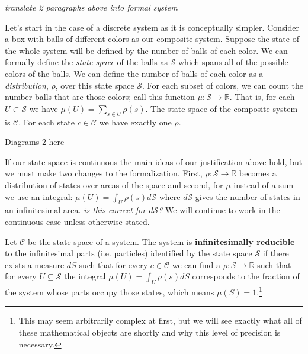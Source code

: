 \documentclass{article}
\begin{document}
	 \emph{translate 2 paragraphs above into formal system}
	
	Let's start in the case of a discrete system as it is conceptually simpler. Consider a box with balls of different colors as our composite system. Suppose the state of the whole system will be defined by the number of balls of each color. We can formally define the \textit{state space} of the balls as $\mathcal{S}$ which spans all of the possible colors of the balls. We can define the number of balls of each color as a \textit{distribution}, $\rho$, over this state space $\mathcal{S}$. For each subset of colors, we can count the number balls that are those colors; call this function $\mu : \mathcal{S} \to \mathbb{R}$. That is, for each $U \subset \mathcal{S}$ we have $\mu(U) = \sum_{s \in U} \rho(s)$. The state space of the composite system is $\mathcal{C}$. For each state $c \in \mathcal{C}$ we have exactly one $\rho$.
	
Diagrams 2 here
	
	If our state space is continuous the main ideas of our justification above hold, but we must make two changes to the formalization. First, $\rho : \mathcal{S} \to \mathbb{R}$ becomes a distribution of states over areas of the space and second, for $\mu$ instead of a sum we use an integral: $\mu(U) = \int_{U} \rho(s) d\mathcal{S}$ where $d\mathcal{S}$ gives the number of states in an infinitesimal area. \emph{is this correct for $d\mathcal{S}$?} We will continue to work in the continuous case unless otherwise stated.
	
\begin{defn}
	Let $\mathcal{C}$ be the state space of a system. The system is \textbf{infinitesimally reducible} to the infinitesimal parts (i.e. particles) identified by the state space $\mathcal{S}$ if there exists a measure $dS$ such that for every $c \in \mathcal{C}$ we can find a $\rho : \mathcal{S} \to \mathbb{R}$ such that for every $U \subseteq \mathcal{S}$ the integral $\mu(U) = \int_U \rho(s) dS$ corresponds to the fraction of the system whose parts occupy those states, which means $\mu(S) = 1$.\footnote{This may seem arbitrarily complex at first, but we will see exactly what all of these mathematical objects are shortly and why this level of precision is necessary.}
\end{defn}	
	
\end{document}
